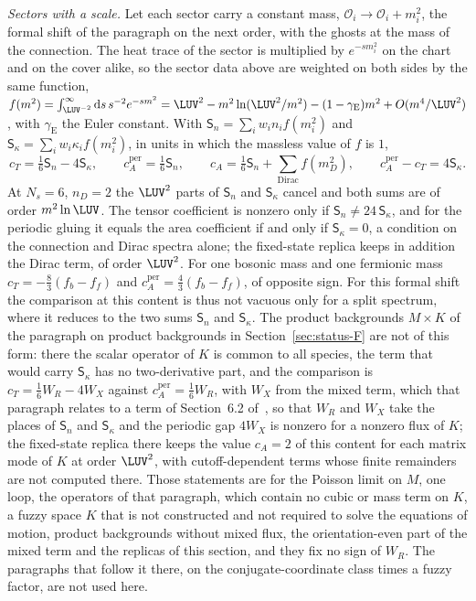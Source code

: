\emph{Sectors with a scale.} Let each sector carry a constant mass, \(\mathcal O_i\to\mathcal O_i+m_i^2\), the formal shift of the paragraph on the next order, with the ghosts at the mass of the connection. The heat trace of the sector is multiplied by \(e^{-sm_i^2}\) on the chart and on the cover alike, so the sector data above are weighted on both sides by the same function, \(f(m^2)=\int_{\LUV^{-2}}^\infty\mathrm ds\,s^{-2}e^{-sm^2}=\LUV^2-m^2\ln(\LUV^2/m^2)-(1-\gamma_{\mathrm E})m^2+O(m^4/\LUV^2)\), with \(\gamma_{\mathrm E}\) the Euler constant. With \(\mathsf S_n=\sum_iw_in_if(m_i^2)\) and \(\mathsf S_\kappa=\sum_iw_i\kappa_if(m_i^2)\), in units in which the massless value of \(f\) is \(1\),
\[
  c_T=\tfrac16\mathsf S_n-4\mathsf S_\kappa,\qquad c_A^{\mathrm{per}}=\tfrac16\mathsf S_n,\qquad c_A=\tfrac16\mathsf S_n+\sum_{\text{Dirac}}f(m_D^2),\qquad c_A^{\mathrm{per}}-c_T=4\mathsf S_\kappa .
\]
At \(N_s=6\), \(n_D=2\) the \(\LUV^2\) parts of \(\mathsf S_n\) and \(\mathsf S_\kappa\) cancel and both sums are of order \(m^2\ln\LUV\). The tensor coefficient is nonzero only if \(\mathsf S_n\neq24\,\mathsf S_\kappa\), and for the periodic gluing it equals the area coefficient if and only if \(\mathsf S_\kappa=0\), a condition on the connection and Dirac spectra alone; the fixed-state replica keeps in addition the Dirac term, of order \(\LUV^2\). For one bosonic mass and one fermionic mass \(c_T=-\tfrac83(f_b-f_f)\) and \(c_A^{\mathrm{per}}=\tfrac43(f_b-f_f)\), of opposite sign. For this formal shift the comparison at this content is thus not vacuous only for a split spectrum, where it reduces to the two sums \(\mathsf S_n\) and \(\mathsf S_\kappa\). The product backgrounds \(M\times K\) of the paragraph on product backgrounds in Section~\ref{sec:status-F} are not of this form: there the scalar operator of \(K\) is common to all species, the term that would carry \(\mathsf S_\kappa\) has no two-derivative part, and the comparison is \(c_T=\tfrac16W_R-4W_X\) against \(c_A^{\mathrm{per}}=\tfrac16W_R\), with \(W_X\) from the mixed term, which that paragraph relates to a term of Section~6.2 of~\cite{Steinacker2023}, so that \(W_R\) and \(W_X\) take the places of \(\mathsf S_n\) and \(\mathsf S_\kappa\) and the periodic gap \(4W_X\) is nonzero for a nonzero flux of \(K\); the fixed-state replica there keeps the value \(c_A=2\) of this content for each matrix mode of \(K\) at order \(\LUV^2\), with cutoff-dependent terms whose finite remainders are not computed there. Those statements are for the Poisson limit on \(M\), one loop, the operators of that paragraph, which contain no cubic or mass term on \(K\), a fuzzy space \(K\) that is not constructed and not required to solve the equations of motion, product backgrounds without mixed flux, the orientation-even part of the mixed term and the replicas of this section, and they fix no sign of \(W_R\). The paragraphs that follow it there, on the conjugate-coordinate class times a fuzzy factor, are not used here.


